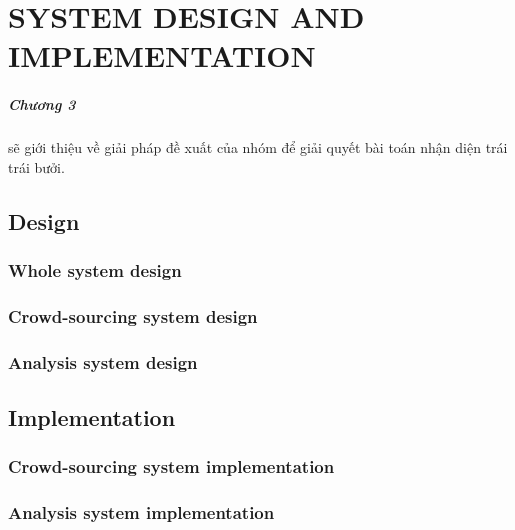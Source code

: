 \chapter{SYSTEM DESIGN AND IMPLEMENTATION}
\label{chap:caseFarming}
\paragraph{Chương 3} sẽ giới thiệu về giải pháp đề xuất của nhóm để giải quyết bài toán nhận diện trái trái bưởi.


\section{Design}
\subsection{Whole system design}
\subsection{Crowd-sourcing system design}
\subsection{Analysis system design}
\section{Implementation}
\subsection{Crowd-sourcing system implementation}
\subsection{Analysis system implementation}

